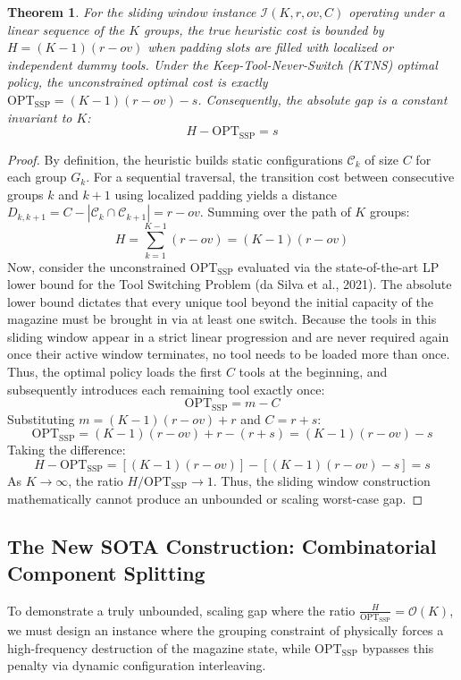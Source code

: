 \documentclass[11pt,a4paper]{article}
\theoremstyle{plain}
\newtheorem{theorem}{Theorem}[section]
\theoremstyle{definition}
\newcommand{\OPT}{\text{OPT}}
\newcommand{\JGP}{\text{JGP}}
\newcommand{\SSP}{\text{SSP}}
\begin{document}
	\begin{theorem}
		For the sliding window instance $\mathcal{I}(K, r, ov, C)$ operating under a linear sequence of the $K$ groups, the true heuristic cost is bounded by $H = (K-1)(r-ov)$ when padding slots are filled with localized or independent dummy tools. Under the Keep-Tool-Never-Switch (KTNS) optimal policy, the unconstrained optimal cost is exactly $\OPT_{\SSP} = (K-1)(r-ov) - s$. Consequently, the absolute gap is a constant invariant to $K$:
		\begin{equation}
			H - \OPT_{\SSP} = s
		\end{equation}
	\end{theorem}
	
	\begin{proof}
		By definition, the heuristic builds static configurations $\mathcal{C}_k$ of size $C$ for each group $G_k$. For a sequential traversal, the transition cost between consecutive groups $k$ and $k+1$ using localized padding yields a distance $D_{k, k+1} = C - |\mathcal{C}_k \cap \mathcal{C}_{k+1}| = r - ov$. Summing over the path of $K$ groups:
		\begin{equation}
		H = \sum_{k=1}^{K-1} (r - ov) = (K-1)(r-ov)
		\end{equation}
	Now, consider the unconstrained $\OPT_{\SSP}$ evaluated via the state-of-the-art LP lower bound for the Tool Switching Problem (da Silva et al., 2021). The absolute lower bound dictates that every unique tool beyond the initial capacity of the magazine must be brought in via at least one switch. Because the tools in this sliding window appear in a strict linear progression and are never required again once their active window terminates, no tool needs to be loaded more than once. Thus, the optimal policy loads the first $C$ tools at the beginning, and subsequently introduces each remaining tool exactly once:
	\[ \OPT_{\SSP} = m - C \]
	Substituting $m = (K-1)(r-ov) + r$ and $C = r + s$:
	\[ \OPT_{\SSP} = (K-1)(r-ov) + r - (r + s) = (K-1)(r-ov) - s \]
	Taking the difference:
	\[ H - \OPT_{\SSP} = \left[(K-1)(r-ov)\right] - \left[(K-1)(r-ov) - s\right] = s \]
	As $K \to \infty$, the ratio $H / \OPT_{\SSP} \to 1$. Thus, the sliding window construction mathematically cannot produce an unbounded or scaling worst-case gap.
\end{proof}

\subsection{The New SOTA Construction: Combinatorial Component Splitting}
To demonstrate a truly unbounded, scaling gap where the ratio $\frac{H}{\OPT_{\SSP}} = \mathcal{O}(K)$, we must design an instance where the grouping constraint of \JGP{} physically forces a high-frequency destruction of the magazine state, while $\OPT_{\SSP}$ bypasses this penalty via dynamic configuration interleaving.
\end{document}
